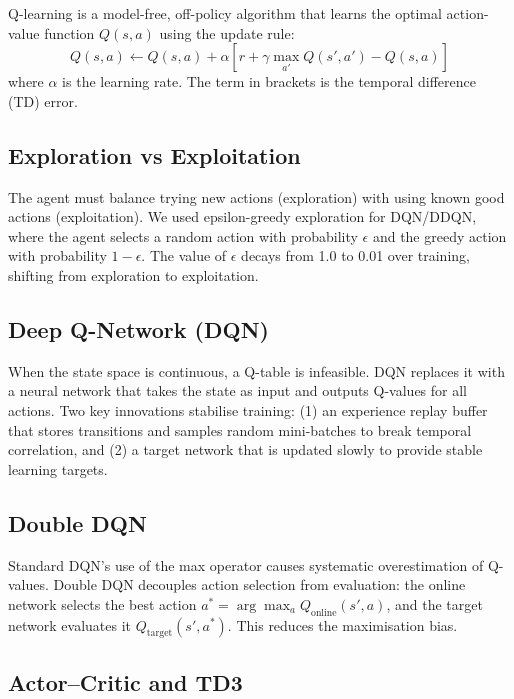 \documentclass[11pt,a4paper]{article}
\begin{document}
Q-learning is a model-free, off-policy algorithm that learns the optimal action-value function $Q(s,a)$ using the update rule:
\begin{equation}
Q(s,a) \leftarrow Q(s,a) + \alpha \left[ r + \gamma \max_{a'} Q(s', a') - Q(s,a) \right]
\end{equation}
where $\alpha$ is the learning rate. The term in brackets is the temporal difference (TD) error.

\subsection{Exploration vs Exploitation}

The agent must balance trying new actions (exploration) with using known good actions (exploitation). We used epsilon-greedy exploration for DQN/DDQN, where the agent selects a random action with probability $\epsilon$ and the greedy action with probability $1-\epsilon$. The value of $\epsilon$ decays from 1.0 to 0.01 over training, shifting from exploration to exploitation.

\subsection{Deep Q-Network (DQN)}

When the state space is continuous, a Q-table is infeasible. DQN replaces it with a neural network that takes the state as input and outputs Q-values for all actions. Two key innovations stabilise training: (1) an experience replay buffer that stores transitions and samples random mini-batches to break temporal correlation, and (2) a target network that is updated slowly to provide stable learning targets.

\subsection{Double DQN}

Standard DQN's use of the max operator causes systematic overestimation of Q-values. Double DQN decouples action selection from evaluation: the online network selects the best action $a^* = \arg\max_a Q_{\text{online}}(s', a)$, and the target network evaluates it $Q_{\text{target}}(s', a^*)$. This reduces the maximisation bias.

\subsection{Actor--Critic and TD3}
\end{document}
